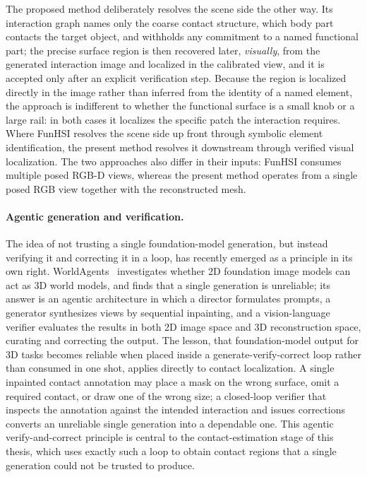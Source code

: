 The proposed method deliberately resolves the scene side the other way. Its interaction graph names only the coarse contact structure, which body part contacts the target object, and withholds any commitment to a named functional part; the precise surface region is then recovered later, \emph{visually}, from the generated interaction image and localized in the calibrated view, and it is accepted only after an explicit verification step. Because the region is localized directly in the image rather than inferred from the identity of a named element, the approach is indifferent to whether the functional surface is a small knob or a large rail: in both cases it localizes the specific patch the interaction requires. Where FunHSI resolves the scene side up front through symbolic element identification, the present method resolves it downstream through verified visual localization. The two approaches also differ in their inputs: FunHSI consumes multiple posed RGB-D views, whereas the present method operates from a single posed RGB view together with the reconstructed mesh.

\paragraph{Agentic generation and verification.} The idea of not trusting a single foundation-model generation, but instead verifying it and correcting it in a loop, has recently emerged as a principle in its own right. WorldAgents~\cite{erkoc2026worldagents} investigates whether 2D foundation image models can act as 3D world models, and finds that a single generation is unreliable; its answer is an agentic architecture in which a director formulates prompts, a generator synthesizes views by sequential inpainting, and a vision-language verifier evaluates the results in both 2D image space and 3D reconstruction space, curating and correcting the output. The lesson, that foundation-model output for 3D tasks becomes reliable when placed inside a generate-verify-correct loop rather than consumed in one shot, applies directly to contact localization. A single inpainted contact annotation may place a mask on the wrong surface, omit a required contact, or draw one of the wrong size; a closed-loop verifier that inspects the annotation against the intended interaction and issues corrections converts an unreliable single generation into a dependable one. This agentic verify-and-correct principle is central to the contact-estimation stage of this thesis, which uses exactly such a loop to obtain contact regions that a single generation could not be trusted to produce.

